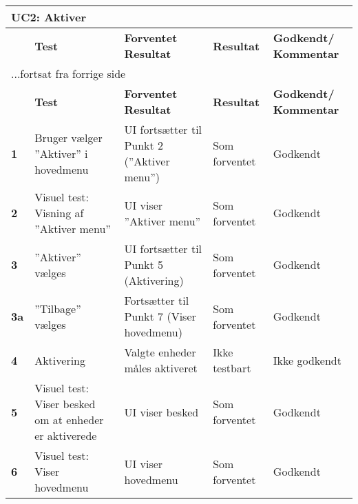 
\begin{center}
\begin{longtable}{|p{}|p{}|p{}|p{}|p{}|} %
\hline
\multicolumn{5}{|l|}{\textbf{UC2: Aktiver}} \\ \hline
\multicolumn{1}{|c|}{} &
\textbf{Test} &
\textbf{Forventet \newline Resultat} &
\textbf{Resultat} &
\textbf{Godkendt/ \newline Kommentar} \\ \hline 
\endfirsthead

\multicolumn{5}{l}{...fortsat fra forrige side} \\ \hline 
\multicolumn{1}{|c|}{} &
\textbf{Test} &
\textbf{Forventet \newline Resultat} &
\textbf{Resultat} &
\textbf{Godkendt/ \newline Kommentar} \\ \hline 
\endhead

		
\textbf{1}			&Bruger vælger ''Aktiver'' i hovedmenu															
					&UI fortsætter til Punkt 2 (''Aktiver menu'')
					&Som \newline forventet 
					&Godkendt \\\hline
					
\textbf{2}			&Visuel test: Visning af ''Aktiver menu''																
					&UI viser ''Aktiver menu''
					&Som \newline forventet 
					&Godkendt \\\hline

\textbf{3}			&''Aktiver'' vælges			
					&UI fortsætter til Punkt 5 (Aktivering)
					&Som \newline forventet 
					&Godkendt \\\hline
					
\textbf{3a}			&''Tilbage'' vælges			
					&Fortsætter til Punkt 7 (Viser hovedmenu)
					&Som \newline forventet 
					&Godkendt \\\hline

\textbf{4}			&Aktivering			
					&Valgte enheder måles aktiveret
					&Ikke \newline testbart 
					&Ikke \newline godkendt \\\hline
		
\textbf{5}			&Visuel test: Viser besked om at enheder er aktiverede
					&UI viser besked
					&Som \newline forventet 
					&Godkendt \\\hline
					
\textbf{6}			&Visuel test: Viser hovedmenu
					&UI viser hovedmenu
					&Som \newline forventet 
					&Godkendt \\\hline

															
	\end{longtable}
	\label{ATUC2} 
\end{center}